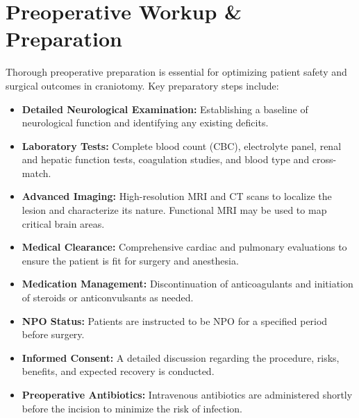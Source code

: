\section*{Preoperative Workup \& Preparation}
Thorough preoperative preparation is essential for optimizing patient safety and surgical outcomes in craniotomy. Key preparatory steps include:

\begin{itemize}
  \item \textbf{Detailed Neurological Examination:} Establishing a baseline of neurological function and identifying any existing deficits.
  
  \item \textbf{Laboratory Tests:} Complete blood count (CBC), electrolyte panel, renal and hepatic function tests, coagulation studies, and blood type and cross-match.
  
  \item \textbf{Advanced Imaging:} High-resolution MRI and CT scans to localize the lesion and characterize its nature. Functional MRI may be used to map critical brain areas.
  
  \item \textbf{Medical Clearance:} Comprehensive cardiac and pulmonary evaluations to ensure the patient is fit for surgery and anesthesia.
  
  \item \textbf{Medication Management:} Discontinuation of anticoagulants and initiation of steroids or anticonvulsants as needed.
  
  \item \textbf{NPO Status:} Patients are instructed to be NPO for a specified period before surgery.
  
  \item \textbf{Informed Consent:} A detailed discussion regarding the procedure, risks, benefits, and expected recovery is conducted.
  
  \item \textbf{Preoperative Antibiotics:} Intravenous antibiotics are administered shortly before the incision to minimize the risk of infection.
\end{itemize}

